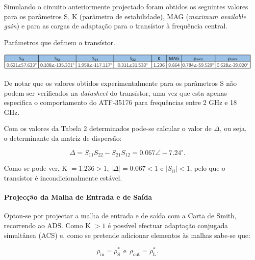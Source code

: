\documentclass[11pt]{article}
\numberwithin{equation}{section}
\begin{document}
Simulando o circuito anteriormente projectado foram obtidos os seguintes valores para os parâmetros S, K (parâmetro de estabilidade), MAG (\textit{maximum available gain}) e para as cargas de adaptação para o transístor à frequência central.

\begin{table}[H]
 	\centering
 	\caption{Parâmetros que definem o transístor.}
 	\vspace{-1.5mm}
 	\includegraphics[keepaspectratio=true, scale=0.45]{teoricas/table2}
 	\label{tab:param_S}
\end{table}

De notar que os valores obtidos experimentalmente para os parâmetros S não podem ser verificados na \textit{datasheet} do transístor, uma vez que esta apenas especifica o comportamento do ATF-35176 para frequências entre 2 GHz e 18 GHz.

Com os valores da Tabela 2 determinados pode-se calcular o valor de $\Delta$, ou seja, o determinante da matriz de dispersão:

\vspace{-3mm}
\begin{equation}
\Delta = S_{11}S_{22} - S_{21}S_{12} = 0.067\angle-7.24 ^{\circ}.
\label{eq:delta}
\end{equation}

\vspace{1mm} 
Como se pode ver, K $= 1.236 > 1$, $\lvert \Delta \rvert = 0.067 < 1$ e $\lvert S_{ii} \rvert < 1$, pelo que o transístor é incondicionalmente estável.

\paragraph{Projecção da Malha de Entrada e de Saída} \hspace{0pt} 

Optou-se por projectar a malha de entrada e de saída com a Carta de Smith, recorrendo ao ADS. Como K $ > 1$ é possível efectuar adaptação conjugada simultânea (ACS) e, como se pretende adicionar elementos às malhas sabe-se que:

\vspace{-3mm}
\begin{equation}
\rho_{\text{in}} = \rho_{\text{S}}^{*} ~~ \text{e} ~~ \rho_{\text{out}} = \rho_{\text{L}}^{*}.
\end{equation}
\end{document}

